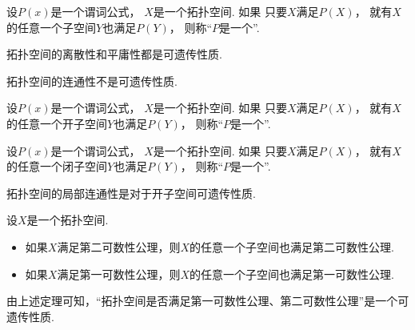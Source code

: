 \begin{definition}
设\(P(x)\)是一个谓词公式，
\(X\)是一个拓扑空间.
如果
	只要\(X\)满足\(P(X)\)，
	就有\(X\)的任意一个子空间\(Y\)也满足\(P(Y)\)，
则称“\(P\)是一个”.
\end{definition}

\begin{proposition}
拓扑空间的离散性和平庸性都是可遗传性质.
\end{proposition}

\begin{proposition}
拓扑空间的连通性不是可遗传性质.
\end{proposition}

\begin{definition}
设\(P(x)\)是一个谓词公式，
\(X\)是一个拓扑空间.
如果
	只要\(X\)满足\(P(X)\)，
	就有\(X\)的任意一个开子空间\(Y\)也满足\(P(Y)\)，
则称“\(P\)是一个”.
\end{definition}

\begin{definition}
设\(P(x)\)是一个谓词公式，
\(X\)是一个拓扑空间.
如果
	只要\(X\)满足\(P(X)\)，
	就有\(X\)的任意一个闭子空间\(Y\)也满足\(P(Y)\)，
则称“\(P\)是一个”.
\end{definition}

\begin{proposition}
拓扑空间的局部连通性是对于开子空间可遗传性质.
\end{proposition}

\begin{theorem}
设\(X\)是一个拓扑空间.
\begin{itemize}
	\item 如果\(X\)满足第二可数性公理，则\(X\)的任意一个子空间也满足第二可数性公理.
	\item 如果\(X\)满足第一可数性公理，则\(X\)的任意一个子空间也满足第一可数性公理.
\end{itemize}
\end{theorem}
\begin{remark}
由上述定理可知，“拓扑空间是否满足第一可数性公理、第二可数性公理”是一个可遗传性质.
\end{remark}

